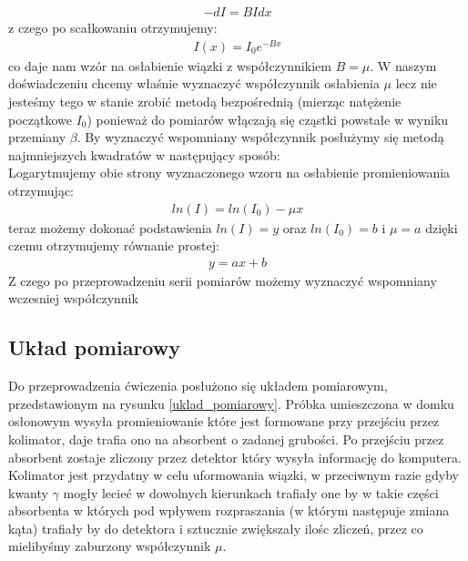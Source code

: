 \documentclass[a4paper]{article}
\begin{document}
\begin{align*}
−dI = B I dx
\end{align*}
z czego po scałkowaniu otrzymujemy:
\begin{align*}
I ( x)=I_0 e^{−B x}
\end{align*}
co daje nam wzór na osłabienie wiązki z współczynnikiem $B = \mu$.
W naszym doświadczeniu chcemy właśnie wyznaczyć współczynnik osłabienia $\mu$ lecz nie jesteśmy tego w stanie zrobić metodą bezpośrednią (mierząc natężenie początkowe $I_0$) ponieważ do pomiarów włączają się cząstki powstałe w wyniku przemiany $\beta$. By wyznaczyć wspomniany współczynnik posłużymy się metodą najmniejszych kwadratów w następujący sposób:\\
Logarytmujemy obie strony wyznaczonego wzoru na osłabienie promieniowania otrzymując:
\begin{align*}
ln( I )=ln( I_0 )−\mu x
\end{align*}
teraz możemy dokonać podstawienia $ln(I) = y$ oraz $ln (I_0 ) =b$ i $\mu = a$ dzięki czemu otrzymujemy równanie prostej:
\begin{align*}
y = ax + b
\end{align*}
Z czego po przeprowadzeniu serii pomiarów możemy wyznaczyć wspomniany wczesniej współczynnik



\subsection{Układ pomiarowy} %
Do przeprowadzenia ćwiczenia posłużono się układem pomiarowym,
przedstawionym na rysunku \ref{uklad_pomiarowy}. Próbka umieszczona w domku osłonowym wysyła promieniowanie które jest formowane przy przejściu przez kolimator, daje trafia ono na absorbent o zadanej grubości. Po przejściu przez absorbent zostaje zliczony przez detektor który wysyła informację do komputera. Kolimator jest przydatny w celu uformowania wiązki, w przeciwnym razie gdyby kwanty $\gamma$ mogły lecieć w dowolnych kierunkach trafiały one by w takie części absorbenta w których pod wpływem rozpraszania (w którym następuje zmiana kąta) trafiały by do detektora i sztucznie zwiększały ilośc zliczeń, przez co mielibyśmy zaburzony współczynnik $\mu$.
\end{document}
